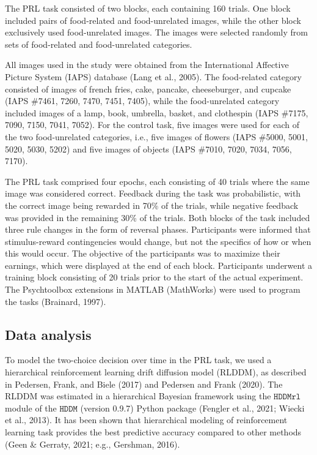 \documentclass[
  man,floatsintext]{apa6}
\begin{document}
The PRL task consisted of two blocks, each containing 160 trials. One block included pairs of food-related and food-unrelated images, while the other block exclusively used food-unrelated images. The images were selected randomly from sets of food-related and food-unrelated categories.

All images used in the study were obtained from the International Affective Picture System (IAPS) database (Lang et al., 2005). The food-related category consisted of images of french fries, cake, pancake, cheeseburger, and cupcake (IAPS \#7461, 7260, 7470, 7451, 7405), while the food-unrelated category included images of a lamp, book, umbrella, basket, and clothespin (IAPS \#7175, 7090, 7150, 7041, 7052). For the control task, five images were used for each of the two food-unrelated categories, i.e., five images of flowers (IAPS \#5000, 5001, 5020, 5030, 5202) and five images of objects (IAPS \#7010, 7020, 7034, 7056, 7170).

The PRL task comprised four epochs, each consisting of 40 trials where the same image was considered correct. Feedback during the task was probabilistic, with the correct image being rewarded in 70\% of the trials, while negative feedback was provided in the remaining 30\% of the trials. Both blocks of the task included three rule changes in the form of reversal phases. Participants were informed that stimulus-reward contingencies would change, but not the specifics of how or when this would occur. The objective of the participants was to maximize their earnings, which were displayed at the end of each block. Participants underwent a training block consisting of 20 trials prior to the start of the actual experiment. The Psychtoolbox extensions in MATLAB (MathWorks) were used to program the tasks (Brainard, 1997).

\hypertarget{data-analysis}{%
\subsection{Data analysis}\label{data-analysis}}

To model the two-choice decision over time in the PRL task, we used a hierarchical reinforcement learning drift diffusion model (RLDDM), as described in Pedersen, Frank, and Biele (2017) and Pedersen and Frank (2020). The RLDDM was estimated in a hierarchical Bayesian framework using the \(\texttt{HDDMrl}\) module of the \(\texttt{HDDM}\) (version 0.9.7) Python package (Fengler et al., 2021; Wiecki et al., 2013). It has been shown that hierarchical modeling of reinforcement learning task provides the best predictive accuracy compared to other methods (Geen \& Gerraty, 2021; e.g., Gershman, 2016).
\end{document}
